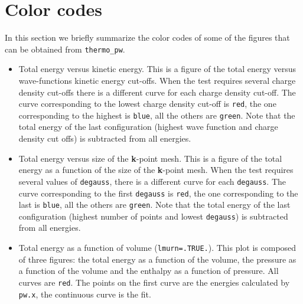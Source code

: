 \documentclass[12pt,a4paper,twoside]{report}
\begin{document}
\newpage
{\color{dark-blue}\chapter{Color codes}}
\color{black}

In this section we briefly summarize the color codes of some of the figures
that can be obtained from \texttt{thermo\_pw}.

\begin{itemize} 
\item
Total energy versus kinetic energy. This is a figure of the total
energy versus wave-functions kinetic energy cut-offs. When the test
requires several charge density cut-offs there is a different curve
for each charge density cut-off. The curve corresponding to the lowest
charge density cut-off is \texttt{red}, the one corresponding to the
highest is \texttt{blue}, all the others are \texttt{green}.
Note that the total energy of the last configuration (highest wave function
and charge density cut offs) is subtracted from all energies.

\item
Total energy versus size of the {\bf k}-point mesh. This is a 
figure of the total energy as a function of the size of the {\bf k}-point
mesh. When the test requires several values of \texttt{degauss}, there
is a different curve for each \texttt{degauss}. The curve corresponding to the
first \texttt{degauss} is \texttt{red}, the one corresponding to the
last is \texttt{blue}, all the others are \texttt{green}.          
Note that the total energy of the last configuration (highest number of
points and lowest \texttt{degauss}) is subtracted from all energies.

\item
Total energy as a function of volume (\texttt{lmurn=.TRUE.}). 
This plot is composed of three figures: the total energy as a function of the
volume, the pressure as a function of the volume and the enthalpy
as a function of pressure. All curves are \texttt{red}.   
The points on the first curve are the energies calculated by 
\texttt{pw.x}, the continuous curve is the fit.


\end{itemize}
\end{document}
